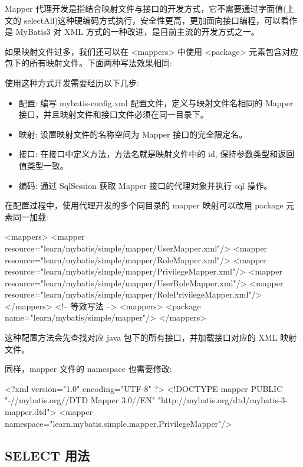 Mapper 代理开发是指结合映射文件与接口的开发方式，它不需要通过字面值(上文的 selectAll)这种硬编码方式执行，安全性更高，更加面向接口编程，可以看作是 MyBatis3 对 XML 方式的一种改进，是目前主流的开发方式之一。

如果映射文件过多，我们还可以在 <mappers> 中使用 <package> 元素包含对应包下的所有映射文件。下面两种写法效果相同:

使用这种方式开发需要经历以下几步:
\begin{itemize}
    \item 配置: 编写 mybatis-config.xml 配置文件，定义与映射文件名相同的 Mapper 接口，并且映射文件和接口文件必须在同一目录下。
    \item 映射: 设置映射文件的名称空间为 Mapper 接口的完全限定名。
    \item 接口: 在接口中定义方法，方法名就是映射文件中的 id, 保持参数类型和返回值类型一致。
    \item 编码: 通过 SqlSession 获取 Mapper 接口的代理对象并执行 sql 操作。
\end{itemize}

在配置过程中，使用代理开发的多个同目录的 mapper 映射可以改用 package 元素同一加载:

\begin{xml}
<mappers>
    <mapper resource="learn/mybatis/simple/mapper/UserMapper.xml"/>
    <mapper resource="learn/mybatis/simple/mapper/RoleMapper.xml"/>
    <mapper resource="learn/mybatis/simple/mapper/PrivilegeMapper.xml"/>
    <mapper resource="learn/mybatis/simple/mapper/UserRoleMapper.xml"/>
    <mapper resource="learn/mybatis/simple/mapper/RolePrivilegeMapper.xml"/>
</mappers>
<!-- 等效写法 -->
<mappers>
    <package name="learn/mybatis/simple/mapper"/>
</mappers>
\end{xml}

这种配置方法会先查找对应 java 包下的所有接口，并加载接口对应的 XML 映射文件。

同样，mapper 文件的 namespace 也需要修改:

\begin{xml}
<?xml version="1.0" encoding="UTF-8" ?>
<!DOCTYPE mapper PUBLIC "-//mybatis.org//DTD Mapper 3.0//EN"
        "http://mybatis.org/dtd/mybatis-3-mapper.dtd">
<mapper namespace="learn.mybatis.simple.mapper.PrivilegeMapper"/>
\end{xml}

\subsection{SELECT 用法}

